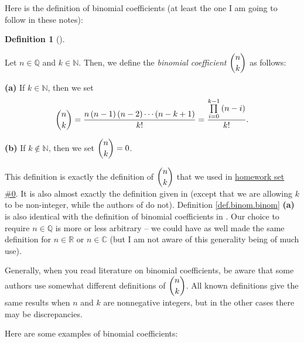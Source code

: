 \documentclass[numbers=enddot,12pt,final,onecolumn,notitlepage]{scrartcl}%
\numberwithin{exer}{subsection}
\theoremstyle{definition}
\newtheorem{defi}[theo]{Definition}
\newenvironment{definition}[1][]
{\begin{defi}[#1]\begin{leftbar}}
{\end{leftbar}\end{defi}}
\let\prodnonlimits\prod
\renewcommand{\prod}{\prodnonlimits\limits}
\begin{document}
Here is the definition of binomial coefficients (at least the one I am going
to follow in these notes):

\begin{definition}
\label{def.binom.binom}Let $n\in\mathbb{Q}$ and $k\in\mathbb{N}$. Then, we
define the \textit{binomial coefficient} $\dbinom{n}{k}$ as follows:

\textbf{(a)} If $k\in\mathbb{N}$, then we set
\[
\dbinom{n}{k}=\dfrac{n\left(  n-1\right)  \left(  n-2\right)  \cdots\left(
n-k+1\right)  }{k!}=\dfrac{\prod_{i=0}^{k-1}\left(  n-i\right)  }{k!}.
\]


\textbf{(b)} If $k\notin\mathbb{N}$, then we set $\dbinom{n}{k}=0$.
\end{definition}

This definition is exactly the definition of $\dbinom{n}{k}$ that we used in
\href{http://www-users.math.umn.edu/~dgrinber/19s/hw0s.pdf}{homework set \#0}.
It is also almost exactly the definition given in \cite[(5.1)]{GKP} (except
that we are allowing $k$ to be non-integer, while the authors of \cite{GKP} do
not). Definition \ref{def.binom.binom} \textbf{(a)} is also identical with the
definition of binomial coefficients in \cite{detnotes}. Our choice to require
$n\in\mathbb{Q}$ is more or less arbitrary -- we could have as well made the
same definition for $n\in\mathbb{R}$ or $n\in\mathbb{C}$ (but I am not aware
of this generality being of much use).

Generally, when you read literature on binomial coefficients, be aware that
some authors use somewhat different definitions of $\dbinom{n}{k}$. All known
definitions give the same results when $n$ and $k$ are nonnegative integers,
but in the other cases there may be discrepancies.

Here are some examples of binomial coefficients:
\end{document}
